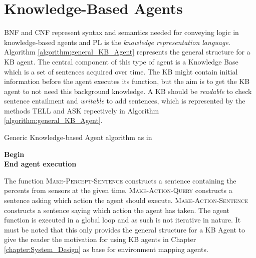 \section{Knowledge-Based Agents}
\label{sec:kb_agents}

BNF and CNF represent syntax and semantics needed for conveying logic in knowledge-based agents and PL is the \textit{knowledge representation language}. Algorithm \ref{algorithm:general_KB_Agent} represents the general structure for a KB agent. The central component of this type of agent is a Knowledge Base which is a set of sentences acquired over time. The KB might contain initial information before the agent executes its function, but the aim is to get the KB agent to not need this background knowledge. A KB should be \textit{readable} to check sentence entailment and \textit{writable} to add sentences, which is represented by the methods \textsc{TELL} and \textsc{ASK} repectively in Algorithm \ref{algorithm:general_KB_Agent}.

\vspace{0.5cm}
\begin{algorithm}[H]
\label{algorithm:general_KB_Agent}
\caption{Generic Knowledge-based Agent algorithm as in \citep{russell2016artificial}}
\SetAlgoLined
\DontPrintSemicolon
{}
\textbf{Begin} \\
\Indm 
\textbf{End agent execution}   \\
\end{algorithm}
\vspace{0.5cm}

The function \textsc{Make-Percept-Sentence} constructs a sentence containing the percents from sensors at the given time. \textsc{Make-Action-Query} constructs a sentence asking which action the agent should execute. \textsc{Make-Action-Sentence} constructs a sentence saying which action the agent has taken. The agent function is executed in a global loop and as such is not iterative in nature. It must be noted that this only provides the general structure for a KB Agent to give the reader the motivation for using KB agents in Chapter \ref{chapter:System_Design} as base for environment mapping agents.



